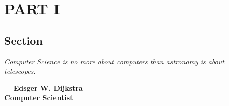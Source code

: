 \chapter{PART I}
\section{\textbf{Section}}
\vspace{15mm}

\begin{flushright}
\textit{Computer Science is no more about computers than astronomy is about telescopes.} 

\vspace{3mm}
--- \textbf{Edsger W. Dijkstra}\\ 
\textbf{\small Computer Scientist}
\vspace{5mm}
\end{flushright}

\vspace{40mm}
